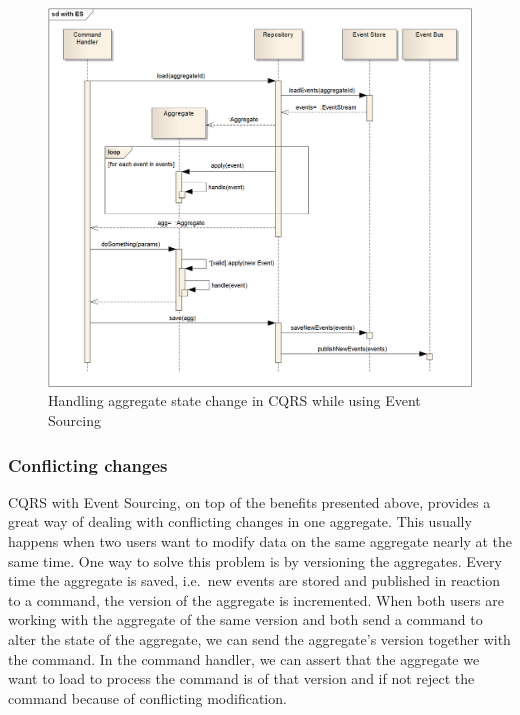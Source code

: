\documentclass{book}
\begin{document}
\begin{figure}[h!]
\begin{center}
\includegraphics[width=0.98\columnwidth]{figures/cqrs-es/cqrs-es}
\caption{Handling aggregate state change in CQRS while using Event Sourcing%
}
\end{center}
\end{figure}

\subsubsection{Conflicting changes}\label{conflicting-changes}

CQRS with Event Sourcing, on top of the benefits presented above,
provides a great way of dealing with conflicting changes in one
aggregate. This usually happens when two users want to modify data on
the same aggregate nearly at the same time. One way to solve this
problem is by versioning the aggregates. Every time the aggregate is
saved, i.e.~new events are stored and published in reaction to a
command, the version of the aggregate is incremented. When both users
are working with the aggregate of the same version and both send a
command to alter the state of the aggregate, we can send the aggregate's
version together with the command. In the command handler, we can assert
that the aggregate we want to load to process the command is of that
version and if not reject the command because of conflicting
modification.
\end{document}
